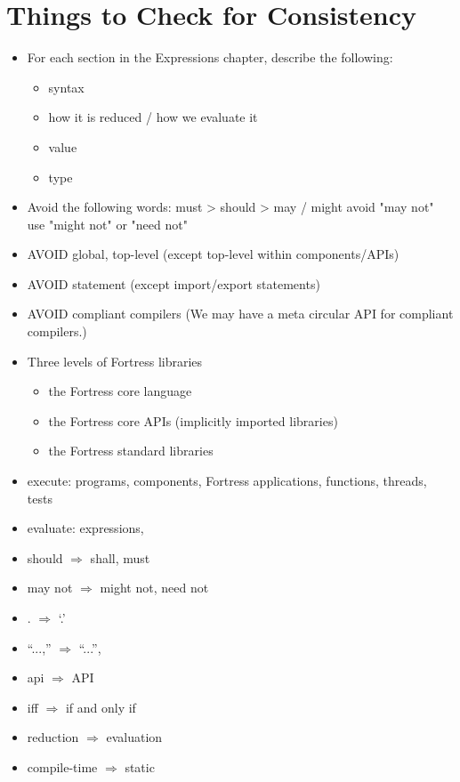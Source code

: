 \section{Things to Check for Consistency}

\begin{itemize}
\item For each section in the Expressions chapter, describe the following:
  \begin{itemize}
  \item syntax
  \item how it is reduced / how we evaluate it
  \item value
  \item type
  \end{itemize}

\item Avoid the following words:
 must > should > may / might
 avoid "may not"
 use "might not" or "need not"
  \item AVOID global, top-level (except top-level within components/APIs)
  \item AVOID statement (except import/export statements)
  \item AVOID compliant compilers (We may have a meta circular API for
  compliant compilers.)
  \item Three levels of Fortress libraries
    \begin{itemize}
    \item the Fortress core language
    \item the Fortress core APIs (implicitly imported libraries)
    \item the Fortress standard libraries
    \end{itemize}
  \item execute: programs, components, Fortress applications, functions,
  threads, tests
  \item evaluate: expressions,
  \item should $\Rightarrow$ shall, must
  \item may not $\Rightarrow$ might not, need not
  \item . $\Rightarrow$ `.'
  \item ``...,'' $\Rightarrow$ ``...'',
  \item api $\Rightarrow$ API
  \item iff $\Rightarrow$ if and only if
  \item reduction $\Rightarrow$ evaluation
  \item compile-time $\Rightarrow$ static

\end{itemize}
